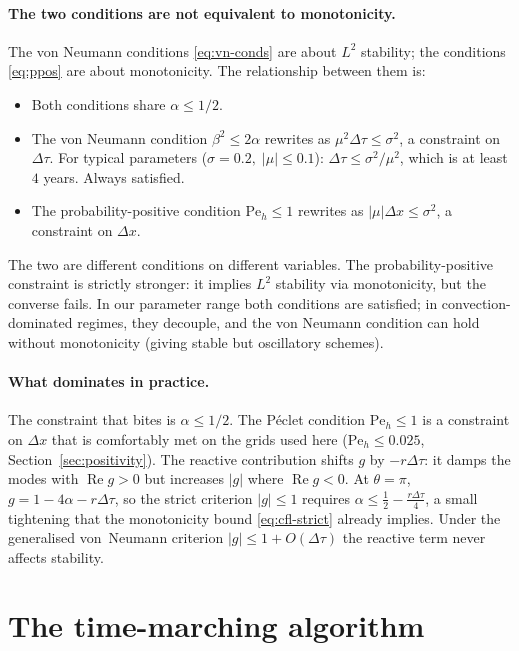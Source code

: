 \documentclass[11pt,a4paper]{article}
\begin{document}
\paragraph{The two conditions are not equivalent to monotonicity.} The
von Neumann conditions \eqref{eq:vn-conds} are about $L^2$
stability; the conditions \eqref{eq:ppos} are about monotonicity. The
relationship between them is:

\begin{itemize}[leftmargin=2em]
\item Both conditions share $\alpha \le 1/2$.
\item The von Neumann condition $\beta^2 \le 2\alpha$ rewrites as
$\mu^2 \Delta\tau \le \sigma^2$, a constraint on $\Delta\tau$. For
typical parameters ($\sigma = 0.2,\;|\mu| \le 0.1$): $\Delta\tau \le
\sigma^2/\mu^2$, which is at least $4$ years. Always satisfied.
\item The probability-positive condition $\mathrm{Pe}_h \le 1$
rewrites as $|\mu| \Delta x \le \sigma^2$, a constraint on $\Delta x$.
\end{itemize}
The two are different conditions on different variables. The
probability-positive constraint is strictly stronger: it implies $L^2$
stability via monotonicity, but the converse fails. In our parameter
range both conditions are satisfied; in convection-dominated regimes,
they decouple, and the von Neumann condition can hold without
monotonicity (giving stable but oscillatory schemes).

\paragraph{What dominates in practice.} The constraint that bites is
$\alpha \le 1/2$. The Péclet condition $\mathrm{Pe}_h \le 1$ is a
constraint on $\Delta x$ that is comfortably met on the grids used
here ($\mathrm{Pe}_h \le 0.025$, Section~\ref{sec:positivity}). The
reactive contribution shifts $g$ by $-r\Delta\tau$: it damps the
modes with $\operatorname{Re} g > 0$ but increases $|g|$ where
$\operatorname{Re} g < 0$. At $\theta = \pi$,
$g = 1 - 4\alpha - r\Delta\tau$, so the strict criterion
$|g| \le 1$ requires $\alpha \le \tfrac{1}{2} - \tfrac{r\Delta\tau}{4}$,
a small tightening that the monotonicity bound \eqref{eq:cfl-strict}
already implies. Under the generalised von~Neumann criterion
$|g| \le 1 + O(\Delta\tau)$ the reactive term never affects stability.

\section{The time-marching algorithm}
\end{document}
